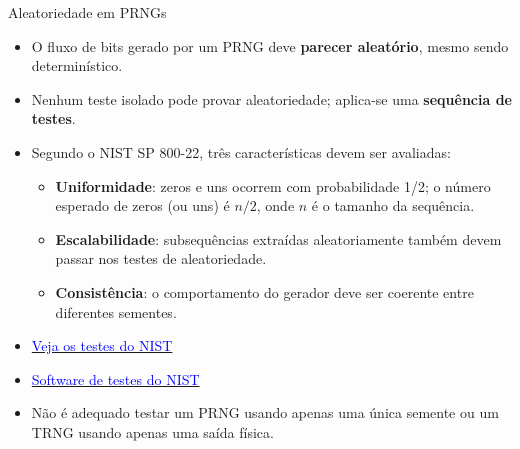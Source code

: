 \begin{frame}{Aleatoriedade em PRNGs}
    \begin{itemize}
        \item O fluxo de bits gerado por um PRNG deve \textbf{parecer aleatório}, mesmo sendo determinístico.
        \item Nenhum teste isolado pode provar aleatoriedade; aplica-se uma \textbf{sequência de testes}.
        \item Segundo o NIST SP 800-22, três características devem ser avaliadas:
              \begin{itemize}
                  \item \textbf{Uniformidade}: zeros e uns ocorrem com probabilidade 1/2; o número esperado de zeros (ou uns) é $n/2$, onde $n$ é o tamanho da sequência.
                  \item \textbf{Escalabilidade}: subsequências extraídas aleatoriamente também devem passar nos testes de aleatoriedade.
                  \item \textbf{Consistência}: o comportamento do gerador deve ser coerente entre diferentes sementes.
              \end{itemize}
        \item \href{https://csrc.nist.gov/pubs/sp/800/22/r1/upd1/final}{\textcolor{blue}{Veja os testes do NIST}}

        \item \href{https://csrc.nist.gov/projects/random-bit-generation/documentation-and-software}{\textcolor{blue}{Software de testes do NIST}}
        \item Não é adequado testar um PRNG usando apenas uma única semente ou um TRNG usando apenas uma saída física.
    \end{itemize}
\end{frame}

